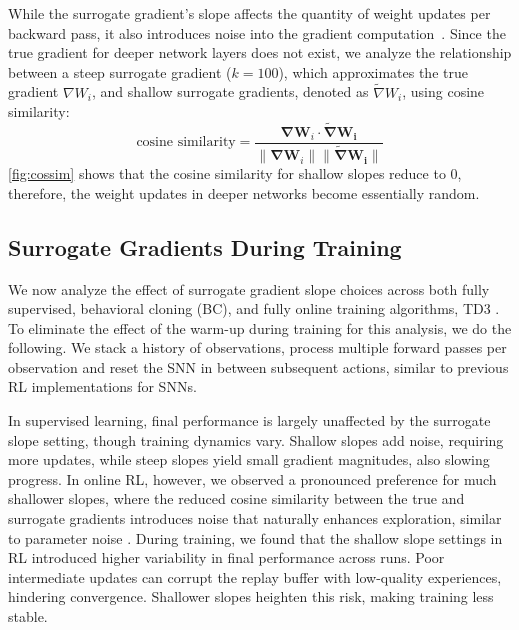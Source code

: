 While the surrogate gradient's slope affects the quantity of weight updates per backward pass, it also introduces noise into the gradient computation~\cite{GygaxElucidating}. Since the true gradient for deeper network layers does not exist, we analyze the relationship between a steep surrogate gradient ($k=100$), which approximates the true gradient $\nabla W_i$, and shallow surrogate gradients, denoted as $\tilde{\nabla}W_i$, using cosine similarity:
\begin{equation}
\text{cosine similarity} = \frac{\mathbf{\nabla W}_i \cdot \mathbf{\tilde{\nabla}W_i}}{\|\mathbf{\nabla W}_i\| \|\mathbf{\tilde{\nabla}W_i}\|}
\end{equation}
\autoref{fig:cossim} shows that the cosine similarity for shallow slopes reduce to $0$, therefore, the weight updates in deeper networks become essentially random.

\subsection{Surrogate Gradients During Training}
We now analyze the effect of surrogate gradient slope choices across both fully supervised, behavioral cloning (BC), and fully online training algorithms,  TD3 \cite{fujimoto2018addressing}. To eliminate the effect of the warm-up during training for this analysis, we do the following. We stack a history of observations, process multiple forward passes per observation and reset the SNN in between subsequent actions, similar to previous RL implementations for SNNs. 

In supervised learning, final performance is largely unaffected by the surrogate slope setting, though training dynamics vary. Shallow slopes add noise, requiring more updates, while steep slopes yield small gradient magnitudes, also slowing progress. In online RL, however, we observed a pronounced preference for much shallower slopes, where the reduced cosine similarity between the true and surrogate gradients introduces noise that naturally enhances exploration, similar to parameter noise \cite{plappert2017parameter}. During training, we found that the shallow slope settings in RL introduced higher variability in final performance across runs. Poor intermediate updates can corrupt the replay buffer with low-quality experiences, hindering convergence. Shallower slopes heighten this risk, making training less stable.

